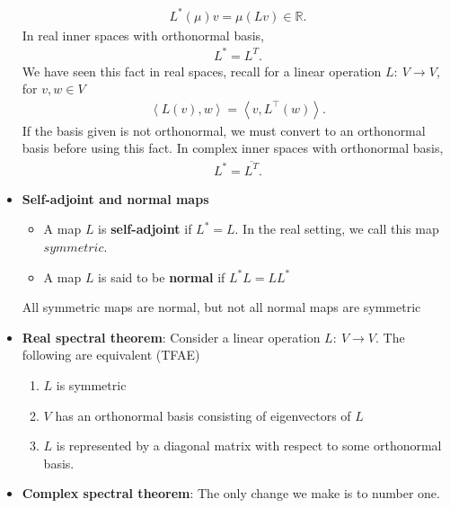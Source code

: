 \documentclass{report}
\begin{document}
\begin{itemize}
            \begin{align*}
                L^{*}(\mu)v = \mu(Lv) \in \mathbb{R}
            .\end{align*}
            \bigbreak \noindent 
            In real inner spaces with orthonormal basis, 
            \begin{align*}
                L^{*} = L^{T}
            .\end{align*}
            \bigbreak \noindent 
            We have seen this fact in real spaces, recall for a linear operation $L:\ V \to V$, for $v,w \in V $
            \begin{align*}
                \left\langle L(v),w \right\rangle = \left\langle v,L^{\top}(w) \right\rangle
            .\end{align*}
            \bigbreak \noindent 
            If the basis given is not orthonormal, we must convert to an orthonormal basis before using this fact.
            \bigbreak \noindent 
            In complex inner spaces with orthonormal basis,
            \begin{align*}
                L^{*} = \overline{L^{T}}
            .\end{align*}
        \item \textbf{Self-adjoint and normal maps}
            \begin{itemize}
                \item A map $L$ is \textbf{self-adjoint} if $L^{*} = L$. In the real setting, we call this map $symmetric$.
                \item A map $L$ is said to be \textbf{normal} if $L^{*}L = LL^{*}$
            \end{itemize}
            \bigbreak \noindent 
            All symmetric maps are normal, but not all normal maps are symmetric
        \item \textbf{Real spectral theorem}: Consider a linear operation $L:\ V\to V$. The following are equivalent (TFAE)
            \begin{enumerate}
                \item $L$ is symmetric
                \item $V$ has an orthonormal basis consisting of eigenvectors of $L$
                \item $L$ is represented by a diagonal matrix with respect to some orthonormal basis.
            \end{enumerate}
        \item \textbf{Complex spectral theorem}: The only change we make is to number one.

\end{itemize}
\end{document}
